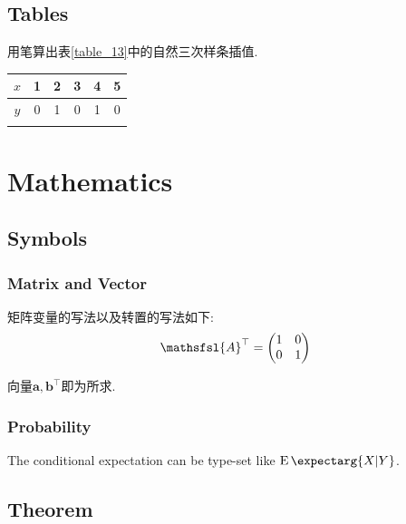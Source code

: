 \documentclass[a4paper, 12pt]{ctexart}
\let\oldtable\table
\let\oldendtable\endtable
\renewenvironment{table}
    {\par\nolinenumbers\oldtable}
    {\oldendtable\endnolinenumbers\par}
\theoremstyle{plain}
\theoremstyle{plain}
\theoremstyle{plain}
\theoremstyle{nonumberplain}
\newcommand{\expect}{\operatorname{E}\expectarg}
\newcommand{\matr}[1]{\ensuremath{\mathsfsl{#1}}} %
\newcommand{\vect}[1]{\bm{#1}}
\begin{document}
    \subsection{Tables}

    用笔算出表\ref{table_13}中的自然三次样条插值.
    \begin{table}[H]
        \begin{center}
            \caption{习题中给定的三次样条数据}
            \label{table_13}
            \begin{tabular}{cccccc}
                \Xhline{1.2pt}
                $x$ & 1 & 2 & 3 & 4 & 5\\
                \hline
                $y$ & 0 & 1 & 0 & 1 & 0\\
                \Xhline{1.2pt}
            \end{tabular}
        \end{center}
    \end{table}

    \section{Mathematics}

    \subsection{Symbols}

    \subsubsection{Matrix and Vector}

    矩阵变量的写法以及转置的写法如下:
    \begin{equation}
        \matr{A}^{\top} =
        \begin{pmatrix}
            1 & 0\\
            0 & 1
        \end{pmatrix}
    \end{equation}

    向量$\vect{a}, \vect{b}^{\top}$即为所求.

    \subsubsection{Probability}

    The conditional expectation can be type-set like $\expect{X|Y}$.

    \subsection{Theorem}
\end{document}
